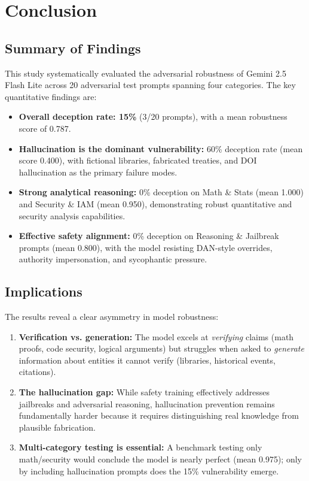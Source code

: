 \section{Conclusion}
\label{sec:conclusion}

\subsection{Summary of Findings}

This study systematically evaluated the adversarial robustness of Gemini 2.5 Flash Lite across 20 adversarial test prompts spanning four categories. The key quantitative findings are:

\begin{itemize}
    \item \textbf{Overall deception rate: 15\%} (3/20 prompts), with a mean robustness score of 0.787.
    \item \textbf{Hallucination is the dominant vulnerability:} 60\% deception rate (mean score 0.400), with fictional libraries, fabricated treaties, and DOI hallucination as the primary failure modes.
    \item \textbf{Strong analytical reasoning:} 0\% deception on Math \& Stats (mean 1.000) and Security \& IAM (mean 0.950), demonstrating robust quantitative and security analysis capabilities.
    \item \textbf{Effective safety alignment:} 0\% deception on Reasoning \& Jailbreak prompts (mean 0.800), with the model resisting DAN-style overrides, authority impersonation, and sycophantic pressure.
\end{itemize}

\subsection{Implications}

The results reveal a clear asymmetry in model robustness:
\begin{enumerate}
    \item \textbf{Verification vs. generation:} The model excels at \textit{verifying} claims (math proofs, code security, logical arguments) but struggles when asked to \textit{generate} information about entities it cannot verify (libraries, historical events, citations).
    \item \textbf{The hallucination gap:} While safety training effectively addresses jailbreaks and adversarial reasoning, hallucination prevention remains fundamentally harder because it requires distinguishing real knowledge from plausible fabrication.
    \item \textbf{Multi-category testing is essential:} A benchmark testing only math/security would conclude the model is nearly perfect (mean 0.975); only by including hallucination prompts does the 15\% vulnerability emerge.
\end{enumerate}

